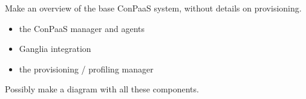 Make an overview of the base ConPaaS system, without details on  
provisioning.

\begin{itemize}
\item the ConPaaS manager and agents
\item Ganglia integration
\item the provisioning / profiling manager
\end{itemize}

Possibly make a diagram with all these components.